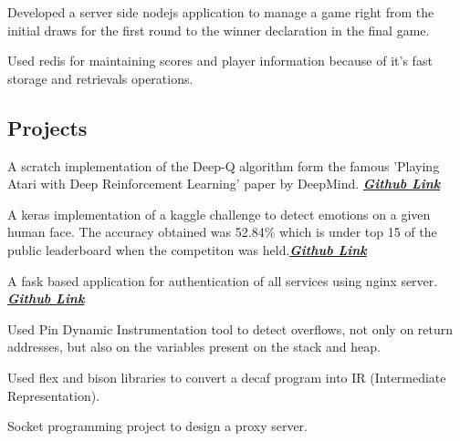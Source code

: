 \documentclass[letterpaper]{deedy-resume} %
\begin{document}
\begin{minipage}[t]{0.66\textwidth}


\begin{tightitemize}
\item Developed a server side nodejs application to manage a game right from the initial draws for the first round to the winner declaration in the final game.
\item Used redis for maintaining scores and player information because of it's fast storage and retrievals operations.
\end{tightitemize}

\sectionspace %

\vspace{\topsep} %
\subsection{Projects}
\vspace{\topsep} %
\begin{tightitemize}
\item {} A scratch implementation of the Deep-Q algorithm form the famous 'Playing Atari with Deep Reinforcement Learning' paper by DeepMind. {\footnotesize \textit{\textbf{\href{https://github.com/jayanthkaturi/deepRL_agent}{Github Link} }}}
\item {} A keras implementation of a kaggle challenge to detect emotions on a given human face. The accuracy obtained was 52.84\% which is under top 15 of the public leaderboard when the competiton was held.{\footnotesize \textit{\textbf{\href{https://github.com/jayanthkaturi/emotion_detection}{Github Link} }}}
\item {} A fask based application for authentication of all services using nginx server. {\footnotesize \textit{\textbf{\href{https://github.com/jayanthkaturi/nginx-auth-proxy}{Github Link}}}}
\item {} Used Pin Dynamic Instrumentation tool to detect overflows, not only on return addresses, but also on the variables present on the stack and heap.
\item {} Used flex and bison libraries to
convert a decaf program into IR (Intermediate Representation).
\item {} Socket programming project to design a proxy server.
\end{tightitemize}


\end{minipage}
\end{document}
